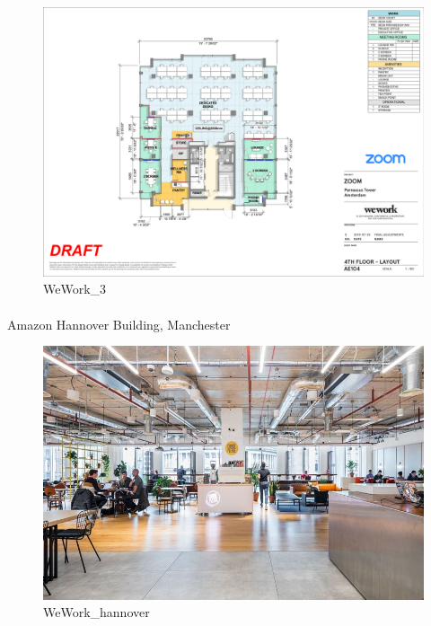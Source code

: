 \documentclass[
]{article}
\makeatletter
\let\oldparagraph\paragraph
\renewcommand{\paragraph}{
    \@ifstar
      \xxxParagraphStar
      \xxxParagraphNoStar
  }
\newcommand{\xxxParagraphStar}[1]{\oldparagraph*{#1}\mbox{}}
\newcommand{\xxxParagraphNoStar}[1]{\oldparagraph{#1}\mbox{}}
\makeatother
\begin{document}
\begin{figure}[H]

{\centering \includegraphics{assets/WeWork/ww-parnassus-4.png}

}

\caption{WeWork\_3}

\end{figure}%

\paragraph{Amazon Hannover Building,
Manchester}\label{amazon-hannover-building-manchester}

\begin{figure}[H]

{\centering \includegraphics{assets/WeWork/WW_hannover.jpg}

}

\caption{WeWork\_hannover}

\end{figure}%
\end{document}
